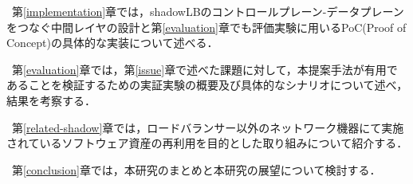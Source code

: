 ~第\ref{implementation}章では，shadowLBのコントロールプレーン-データプレーンをつなぐ中間レイヤの設計と第\ref{evaluation}章でも評価実験に用いるPoC(Proof of Concept)の具体的な実装について述べる．

~第\ref{evaluation}章では，第\ref{issue}章で述べた課題に対して，本提案手法が有用であることを検証するための実証実験の概要及び具体的なシナリオについて述べ，結果を考察する．

~第\ref{related-shadow}章では，ロードバランサー以外のネットワーク機器にて実施されているソフトウェア資産の再利用を目的とした取り組みについて紹介する．

~第\ref{conclusion}章では，本研究のまとめと本研究の展望について検討する．


